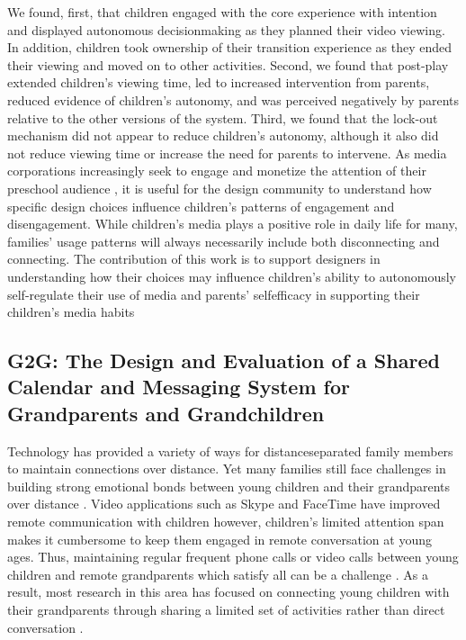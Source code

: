 We found, first, that children engaged with the core experience with intention and displayed autonomous decisionmaking as they planned their video viewing. In addition,
children took ownership of their transition experience as they
ended their viewing and moved on to other activities. Second, we found that post-play extended children’s viewing
time, led to increased intervention from parents, reduced evidence of children’s autonomy, and was perceived negatively
by parents relative to the other versions of the system. Third,
we found that the lock-out mechanism did not appear to reduce children’s autonomy, although it also did not reduce
viewing time or increase the need for parents to intervene.
As media corporations increasingly seek to engage and monetize the attention of their preschool audience , it is useful
for the design community to understand how specific design
choices influence children’s patterns of engagement and disengagement. While children’s media plays a positive role in
daily life for many, families’ usage patterns will always necessarily include both disconnecting and connecting. The contribution of this work is to support designers in understanding how their choices may influence children’s ability to autonomously self-regulate their use of media and parents’ selfefficacy in supporting their children’s media habits


\subsection{G2G: The Design and Evaluation of a Shared Calendar and
Messaging System for Grandparents and Grandchildren }

Technology has provided a variety of ways for distanceseparated family members to maintain connections over
distance. Yet many families still face challenges in building
strong emotional bonds between young children and their
grandparents over distance .
Video applications such as Skype and FaceTime have
improved remote communication with children
however, children’s limited attention span makes it
cumbersome to keep them engaged in remote conversation
at young ages. Thus, maintaining regular frequent phone
calls or video calls between young children and remote
grandparents which satisfy all can be a challenge . As a
result, most research in this area has focused on connecting
young children with their grandparents through sharing a
limited set of activities rather than direct conversation
. 

